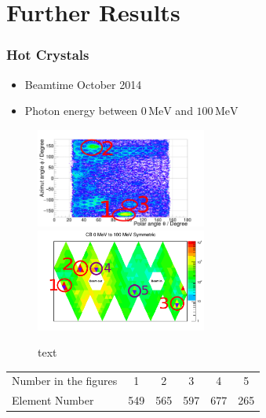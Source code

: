 \documentclass[slidestop,compress,mathserif]{beamer}
\begin{document}
\section{Further Results}
\begin{frame}
	\frametitle{Hot Crystals}
	\begin{itemize}
		\item Beamtime October 2014
		\item Photon energy between $0\,\text{MeV}$ and $100\,\text{MeV}$
	\end{itemize}
	\begin{figure}
		\includegraphics[width=0.50\textwidth]{Pictures/20172104StrahlzeitClusterSize0Marker}
		\includegraphics[width=0.50\textwidth]{Pictures/20172104StrahlzeitClusterSize0MarkerMap}
		\caption{text}
	\end{figure}
	
	\begin{table}
	\begin{tabular}{lccccc}
		Number in the figures & 1 & 2 & 3 & 4 & 5 \\
		Element Number & 549 & 565 & 597 & 677 & 265 
		
	\end{tabular}
	\end{table}
\end{frame}
\end{document}

